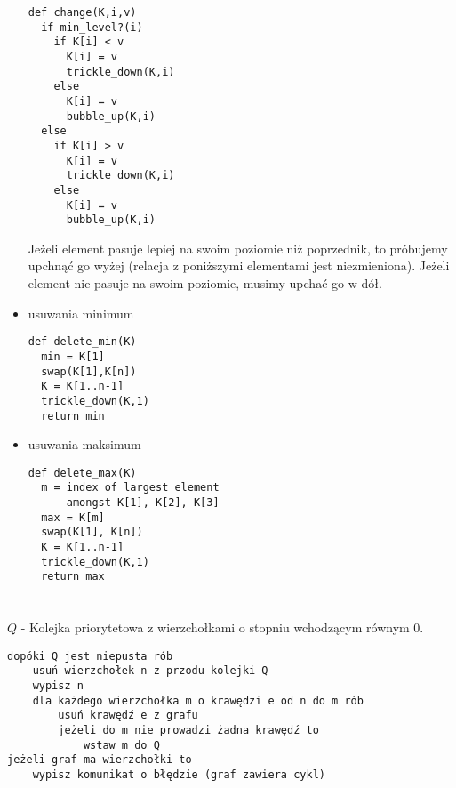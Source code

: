 \begin{itemize}
\begin{verbatim}
def change(K,i,v)
  if min_level?(i)
    if K[i] < v
      K[i] = v
      trickle_down(K,i)
    else
      K[i] = v
      bubble_up(K,i)   
  else
    if K[i] > v
      K[i] = v
      trickle_down(K,i)
    else
      K[i] = v
      bubble_up(K,i)
\end{verbatim}

Jeżeli element pasuje lepiej na swoim poziomie niż poprzednik, to próbujemy upchnąć go wyżej (relacja z poniższymi elementami jest niezmieniona). Jeżeli element nie pasuje na swoim poziomie, musimy upchać go w dół.

\item{usuwania minimum}
\begin{verbatim}
def delete_min(K)
  min = K[1]
  swap(K[1],K[n])
  K = K[1..n-1]
  trickle_down(K,1)
  return min
 \end{verbatim}
\item{usuwania maksimum}
\begin{verbatim}
def delete_max(K)
  m = index of largest element 
      amongst K[1], K[2], K[3]
  max = K[m]
  swap(K[1], K[n])
  K = K[1..n-1]
  trickle_down(K,1)
  return max
\end{verbatim}
\end{itemize}
\section{}%

$Q$ - Kolejka priorytetowa z wierzchołkami o stopniu wchodzącym równym $0$.


\begin{verbatim}
dopóki Q jest niepusta rób
    usuń wierzchołek n z przodu kolejki Q
    wypisz n
    dla każdego wierzchołka m o krawędzi e od n do m rób
        usuń krawędź e z grafu
        jeżeli do m nie prowadzi żadna krawędź to
            wstaw m do Q
jeżeli graf ma wierzchołki to
    wypisz komunikat o błędzie (graf zawiera cykl)
\end{verbatim}    

